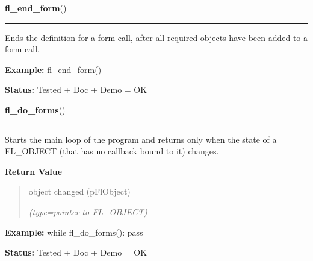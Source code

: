     \label{xformslib:flbasic:fl_end_form}

    \vspace{0.5ex}

\hspace{.8\funcindent}\begin{boxedminipage}{\funcwidth}

    \raggedright \textbf{fl\_end\_form}()

    \vspace{-1.5ex}

    \rule{\textwidth}{0.5\fboxrule}
\setlength{\parskip}{2ex}
    Ends the definition for a form call, after all required objects have 
    been added to a form call.

\setlength{\parskip}{1ex}
\textbf{Example:} fl\_end\_form()



\textbf{Status:} Tested + Doc + Demo = OK



    \end{boxedminipage}

    \label{xformslib:flbasic:fl_do_forms}

    \vspace{0.5ex}

\hspace{.8\funcindent}\begin{boxedminipage}{\funcwidth}

    \raggedright \textbf{fl\_do\_forms}()

    \vspace{-1.5ex}

    \rule{\textwidth}{0.5\fboxrule}
\setlength{\parskip}{2ex}
    Starts the main loop of the program and returns only when the state of 
    a FL\_OBJECT (that has no callback bound to it) changes.

\setlength{\parskip}{1ex}
      \textbf{Return Value}
    \vspace{-1ex}

      \begin{quote}
      object changed (pFlObject)

      {\it (type=pointer to FL\_OBJECT)}

      \end{quote}

\textbf{Example:} while fl\_do\_forms(): pass



\textbf{Status:} Tested + Doc + Demo = OK



    \end{boxedminipage}

